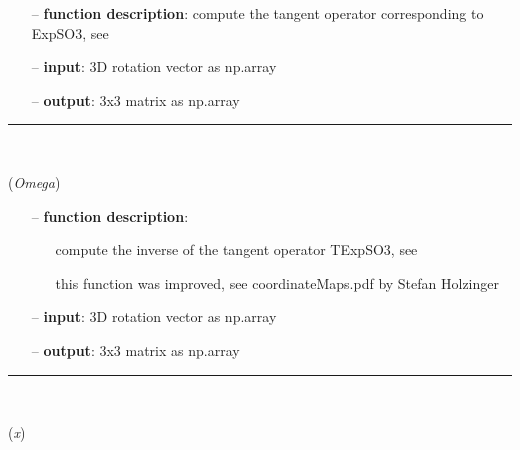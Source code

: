 \begin{itemize}[leftmargin=1.4cm]
\begin{itemize}[leftmargin=0.5cm]
\begin{itemize}[leftmargin=1.4cm]
\begin{itemize}[leftmargin=0.5cm]
\begin{itemize}[leftmargin=1.4cm]
\begin{itemize}[leftmargin=0.5cm]
\begin{itemize}[leftmargin=1.4cm]
\begin{itemize}[leftmargin=1.4cm]
\begin{itemize}[leftmargin=1.4cm]
\begin{itemize}[leftmargin=1.4cm]
\begin{itemize}[leftmargin=0.5cm]
\begin{itemize}[leftmargin=0.7cm]
  \item[--]  {\bf function description}: compute the tangent operator corresponding to ExpSO3, see \cite{Bruels2011}  \item[--]  {\bf input}: 3D rotation vector as np.array  \item[--]  {\bf output}: 3x3 matrix as np.array\vspace{12pt}\end{itemize}
%
\noindent\rule{8cm}{0.75pt}\vspace{1pt} \\ 
\begin{flushleft}
\label{sec:lieGroupBasics:TExpSO3Inv}
({\it Omega})
\end{flushleft}
\setlength{\itemindent}{0.7cm}
\begin{itemize}[leftmargin=0.7cm]
  \item[--]  {\bf function description}: \vspace{-6pt}
  \begin{itemize}[leftmargin=1.2cm]
\setlength{\itemindent}{-0.7cm}
    \item[] compute the inverse of the tangent operator TExpSO3, see \cite{Sonneville2014}
    \item[]             this function was improved, see coordinateMaps.pdf by Stefan Holzinger
  \end{itemize}
  \item[--]  {\bf input}: 3D rotation vector as np.array  \item[--]  {\bf output}: 3x3 matrix as np.array\vspace{12pt}\end{itemize}
%
\noindent\rule{8cm}{0.75pt}\vspace{1pt} \\ 
\begin{flushleft}
\label{sec:lieGroupBasics:ExpSE3}
({\it x})
\end{flushleft}
\setlength{\itemindent}{0.7cm}
\begin{itemize}[leftmargin=0.7cm]

\end{itemize}
\end{itemize}
\end{itemize}
\end{itemize}
\end{itemize}
\end{itemize}
\end{itemize}
\end{itemize}
\end{itemize}
\end{itemize}
\end{itemize}
\end{itemize}
